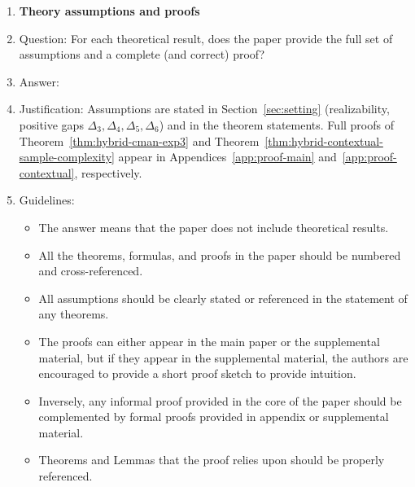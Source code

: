 \documentclass{article}
\begin{document}
\begin{enumerate}
\begin{itemize}
        \item While the authors might fear that complete honesty about limitations might be used by reviewers as grounds for rejection, a worse outcome might be that reviewers discover limitations that aren't acknowledged in the paper. The authors should use their best judgment and recognize that individual actions in favor of transparency play an important role in developing norms that preserve the integrity of the community. Reviewers will be specifically instructed to not penalize honesty concerning limitations.
    \end{itemize}

\item {\bf Theory assumptions and proofs}
    \item[] Question: For each theoretical result, does the paper provide the full set of assumptions and a complete (and correct) proof?
    \item[] Answer: \answerYes{}
    \item[] Justification: Assumptions are stated in Section~\ref{sec:setting} (realizability, positive gaps $\Delta_3,\Delta_4,\Delta_5,\Delta_6$) and in the theorem statements. Full proofs of Theorem~\ref{thm:hybrid-cman-exp3} and Theorem~\ref{thm:hybrid-contextual-sample-complexity} appear in Appendices~\ref{app:proof-main} and~\ref{app:proof-contextual}, respectively.
    \item[] Guidelines:
    \begin{itemize}
        \item The answer \answerNA{} means that the paper does not include theoretical results.
        \item All the theorems, formulas, and proofs in the paper should be numbered and cross-referenced.
        \item All assumptions should be clearly stated or referenced in the statement of any theorems.
        \item The proofs can either appear in the main paper or the supplemental material, but if they appear in the supplemental material, the authors are encouraged to provide a short proof sketch to provide intuition.
        \item Inversely, any informal proof provided in the core of the paper should be complemented by formal proofs provided in appendix or supplemental material.
        \item Theorems and Lemmas that the proof relies upon should be properly referenced.
    \end{itemize}


\end{enumerate}
\end{document}

